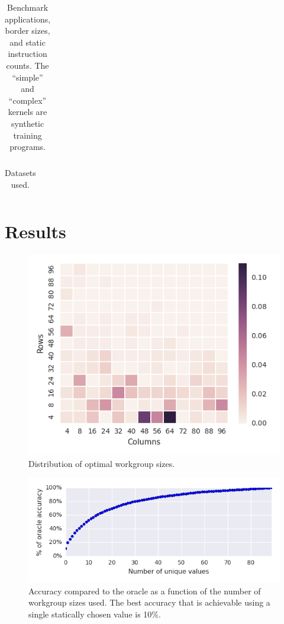 \begin{table}
\footnotesize
\centering
\begin{tabular}{| l | l | l | l | l | l |}
\hline

\hline
\end{tabular}
\caption{%
  Benchmark applications, border sizes, and static instruction counts.
  The ``simple'' and ``complex'' kernels are synthetic training
  programs. %
}
\label{tab:kernels}
\end{table}

\begin{table}
\footnotesize
\centering
\begin{tabular}{| l | l | l | l |}
\hline

\hline
\end{tabular}
\caption{%
  Datasets used.%
}
\label{tab:datasets}
\end{table}

\section{Results}

\begin{figure}
\centering
\includegraphics{gen/img/oracle_param_space.png}
\caption{%
  Distribution of optimal workgroup sizes.%
}
\end{figure}

\begin{figure}
\centering
\includegraphics{gen/img/num_param_oracle.png}
\caption{%
  Accuracy compared to the oracle as a function of the number of
  workgroup sizes used. The best accuracy that is achievable using a
  single statically chosen value is 10\%.%
}
\end{figure}

